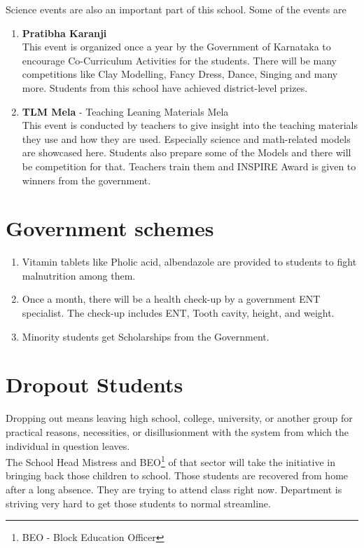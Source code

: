 Science events are also an important part of this school. Some of the events are 
\begin{enumerate}
    \item \textbf{Pratibha Karanji} \\
    This event is organized once a year by the Government of Karnataka to encourage Co-Curriculum Activities for the students. There will be many competitions like Clay Modelling, Fancy Dress, Dance, Singing and many more. Students from this school have achieved district-level prizes.
    \item \textbf{TLM Mela} - Teaching Leaning Materials Mela \\
    This event is conducted by teachers to give insight into the teaching materials they use and how they are used. Especially science and math-related models are showcased here. Students also prepare some of the Models and there will be competition for that. Teachers train them and INSPIRE Award is given to winners from the government.  
\end{enumerate}

\section{Government schemes}
\begin{enumerate}
    \item Vitamin tablets like Pholic acid, albendazole are provided to students to fight malnutrition among them.
    \item Once a month, there will be a health check-up by a government ENT specialist. The check-up includes ENT, Tooth cavity, height, and weight. 
    \item  Minority students get Scholarships from the Government. 
\end{enumerate}
\section{Dropout Students}
Dropping out means leaving high school, college, university, or another group for practical reasons, necessities, or disillusionment with the system from which the individual in question leaves.\\

The School Head Mistress and BEO\footnote{BEO - Block Education Officer} of that sector will take the initiative in bringing back those children to school. Those students are recovered from home after a long absence. They are trying to attend class right now. Department is striving very hard to get those students to normal streamline. 

